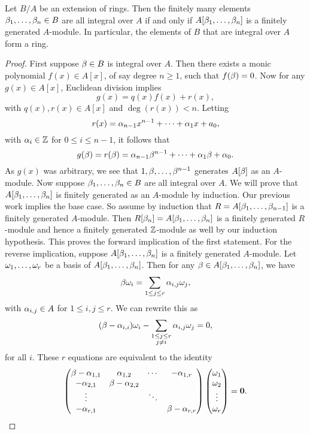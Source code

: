     \begin{proposition}\label{prop:integral_if_finitely_generated}
      Let $B/A$ be an extension of rings. Then the finitely many elements $\beta_{1},\ldots,\beta_{n} \in B$ are all integral over $A$ if and only if $A[\beta_{1},\ldots,\beta_{n}]$ is a finitely generated $A$-module. In particular, the elements of $B$ that are integral over $A$ form a ring.
    \end{proposition}
    \begin{proof}
      First suppose $\beta \in B$ is integral over $A$. Then there exists a monic polynomial $f(x) \in A[x]$, of say degree $n \ge 1$, such that $f(\beta) = 0$. Now for any $g(x) \in A[x]$, Euclidean division implies
      \[
        g(x) = q(x)f(x)+r(x),
      \]
      with $q(x),r(x) \in A[x]$ and $\deg(r(x)) < n$. Letting
      \[
        r(x) = \alpha_{n-1}x^{n-1}+\cdots+\alpha_{1}x+a_{0},
      \]
      with $\alpha_{i} \in \mathbb{Z}$ for $0 \le i \le n-1$, it follows that
      \[
        g(\beta) = r(\beta) = \alpha_{n-1}\beta^{n-1}+\cdots+\alpha_{1}\beta+\alpha_{0}.
      \]
      As $g(x)$ was arbitrary, we see that $1,\beta,\ldots,\beta^{n-1}$ generates $A[\beta]$ as an $A$-module. Now suppose $\beta_{1},\ldots,\beta_{n} \in B$ are all integral over $A$. We will prove that $A[\beta_{1},\ldots,\beta_{n}]$ is finitely generated as an $A$-module by induction. Our previous work implies the base case. So assume by induction that $R = A[\beta_{1},\ldots,\beta_{n-1}]$ is a finitely generated $A$-module. Then $R[\beta_{n}] = A[\beta_{1},\ldots,\beta_{n}]$ is a finitely generated $R$-module and hence a finitely generated $\mathbb{Z}$-module as well by our induction hypothesis. This proves the forward implication of the first statement. For the reverse implication, suppose $A[\beta_{1},\ldots,\beta_{n}]$ is a finitely generated $A$-module. Let $\omega_{1},\ldots,\omega_{r}$ be a basis of $A[\beta_{1},\ldots,\beta_{n}]$. Then for any $\beta \in A[\beta_{1},\ldots,\beta_{n}]$, we have
      \[
        \beta\omega_{i} = \sum_{1 \le j \le r}\alpha_{i,j}\omega_{j},
      \]
      with $\alpha_{i,j} \in A$ for $1 \le i,j \le r$. We can rewrite this as
      \[
        (\beta-\alpha_{i,i})\omega_{i}-\sum_{\substack{1 \le j \le r \\ j \neq i}}\alpha_{i,j}\omega_{j} = 0,
      \]
      for all $i$. These $r$ equations are equivalent to the identity
      \[
        \begin{pmatrix} \beta-\alpha_{1,1} & \alpha_{1,2} & \cdots & -\alpha_{1,r} \\ -\alpha_{2,1} & \beta-\alpha_{2,2} & & \\ \vdots & & \ddots & \\ -\alpha_{r,1} & & & \beta-\alpha_{r,r} \end{pmatrix}\begin{pmatrix} \omega_{1} \\ \omega_{2} \\ \vdots \\ \omega_{r} \end{pmatrix} = \mathbf{0}.
\]
\end{proof}
